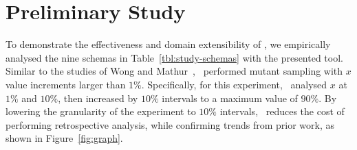 \section{Preliminary Study}

To demonstrate the effectiveness and domain extensibility of \mrstudyr, we empirically analysed the nine schemas in
Table~\ref{tbl:study-schemas} with the presented tool. Similar to the studies of Wong and
Mathur~\cite{mathur1994empirical}, \mr~performed mutant sampling with $x$ value increments larger than $1\%$.
Specifically, for this experiment, \mr~analysed $x$ at $1\%$ and $10\%$, then increased by $10\%$ intervals to a maximum
value of $90\%$. By lowering the granularity of the experiment to $10\%$ intervals, \mr~reduces the cost of performing
retrospective analysis, while confirming trends from prior work, as shown in Figure~\ref{fig:graph}.








